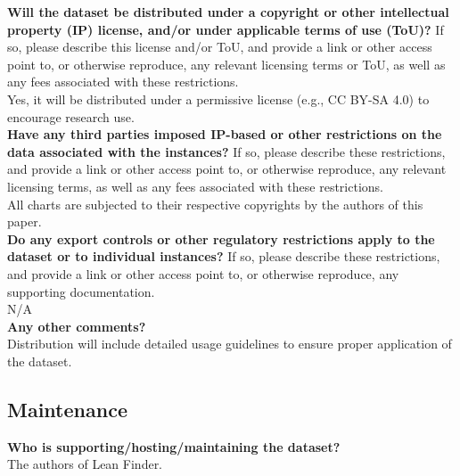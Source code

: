     \textcolor{\sectioncolor}{\textbf{Will the dataset be distributed under a copyright or other intellectual
    property (IP) license, and/or under applicable terms of use (ToU)?
    }
    If so, please describe this license and/or ToU, and provide a link or other
    access point to, or otherwise reproduce, any relevant licensing terms or
    ToU, as well as any fees associated with these restrictions.
    } \\
    Yes, it will be distributed under a permissive license (e.g., CC BY-SA 4.0) to encourage research use. \\

    \textcolor{\sectioncolor}{\textbf{Have any third parties imposed IP-based or other restrictions on the data
    associated with the instances?
    }
    If so, please describe these restrictions, and provide a link or other
    access point to, or otherwise reproduce, any relevant licensing terms, as
    well as any fees associated with these restrictions.
    } \\
    All charts are subjected to their respective copyrights by the authors of this paper. \\

    \textcolor{\sectioncolor}{\textbf{Do any export controls or other regulatory restrictions apply to the
    dataset or to individual instances?
    }
    If so, please describe these restrictions, and provide a link or other
    access point to, or otherwise reproduce, any supporting documentation.
    } \\
    N/A \\

    \textcolor{\sectioncolor}{\textbf{Any other comments?
    }} \\
    Distribution will include detailed usage guidelines to ensure proper application of the dataset. \\

\subsection{Maintenance}

    \textcolor{\sectioncolor}{\textbf{Who is supporting/hosting/maintaining the dataset?
    }
    } \\
    The authors of Lean Finder. \\

